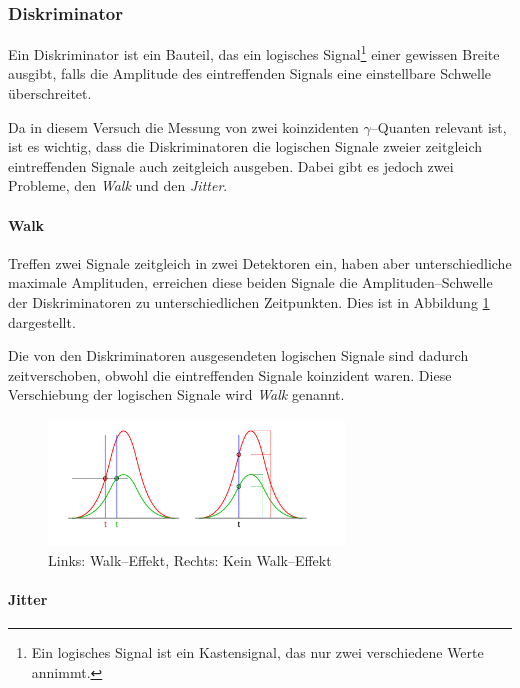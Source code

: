 \documentclass[12pt,a4paper]{scrartcl}
\numberwithin{equation}{section} %
\begin{document}
\hypertarget{diskriminator}{%
\subsubsection{Diskriminator}\label{diskriminator}}

Ein Diskriminator ist ein Bauteil, das ein logisches Signal\footnote{Ein logisches Signal ist ein Kastensignal, das nur zwei verschiedene Werte annimmt.} einer gewissen Breite ausgibt, falls die Amplitude des eintreffenden Signals eine einstellbare Schwelle überschreitet.

Da in diesem Versuch die Messung von zwei koinzidenten $\gamma$--Quanten relevant ist, ist es wichtig, dass die Diskriminatoren die logischen Signale zweier zeitgleich eintreffenden Signale auch zeitgleich ausgeben. Dabei gibt es jedoch zwei Probleme, den \emph{Walk} und den \emph{Jitter}.

\paragraph{Walk}
Treffen zwei Signale zeitgleich in zwei Detektoren ein, haben aber unterschiedliche maximale Amplituden, erreichen diese beiden Signale die Amplituden--Schwelle der Diskriminatoren zu unterschiedlichen Zeitpunkten. Dies ist in Abbildung \ref{abb:Walk-Effekt} dargestellt.

Die von den Diskriminatoren ausgesendeten logischen Signale sind dadurch zeitverschoben, obwohl die eintreffenden Signale koinzident waren. Diese Verschiebung der logischen Signale wird \emph{Walk} genannt.

\begin{figure}[h]
	\centering
	\includegraphics[width=0.7\textwidth]{../media/B3.4/Constant_fraction_1.pdf}
	\caption{Links: Walk--Effekt, Rechts: Kein Walk--Effekt \cite{abb:Constant_fraction}}
	\label{abb:Walk-Effekt}
\end{figure}

\hypertarget{jitter}{%
\paragraph{Jitter}\label{jitter}}
\end{document}
